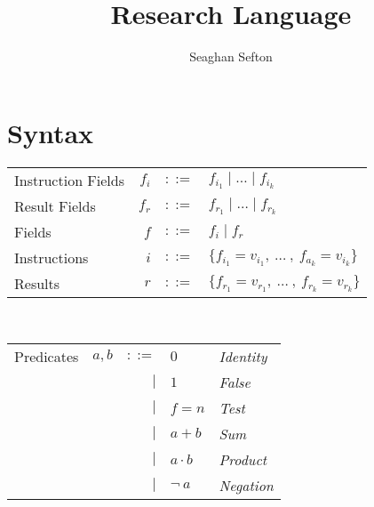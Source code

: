 \documentclass[12pt, letterpaper]{article}
\title{Research Language}
\author{Seaghan Sefton}
\begin{document}
\section{Syntax}

    \begin{tabular}{l r c l}
        Instruction Fields   & $f_{i}$   & $::=$     & $f_{i_{1}} \mid \dots \mid f_{i_{k}}$\\
        Result Fields   & $f_{r}$   & $::=$     & $f_{r_{1}} \mid \dots \mid f_{r_{k}}$\\
        Fields          & $f$       & $::=$     & $f_i \mid f_r$ \\
        Instructions         & $i$       & $::=$     & $\{f_{i_{1}} = v_{i_{1}} ,\ \dots\ ,\ f_{a_{k}} = v_{i_{k}}\}$\\
        Results         & $r$       & $::=$     & $\{f_{r_{1}} = v_{r_{1}} ,\ \dots\ ,\ f_{r_{k}} = v_{r_{k}}\}$\\
    \end{tabular}\\

    \begin{tabular}{l c r l l}
        Predicates  & $a,b$     & $::=$  & $0$          & \textit{Identity} \\
                    &           & $\mid$ & $1$          & \textit{False}    \\
                    &           & $\mid$ & $f=n$        & \textit{Test} \\  
                    &           & $\mid$ & $a + b$      & \textit{Sum}      \\
                    &           & $\mid$ & $a \cdot b$  & \textit{Product}  \\
                    &           & $\mid$ & $\neg \ a$   & \textit{Negation}
    \end{tabular}\\
\end{document}

